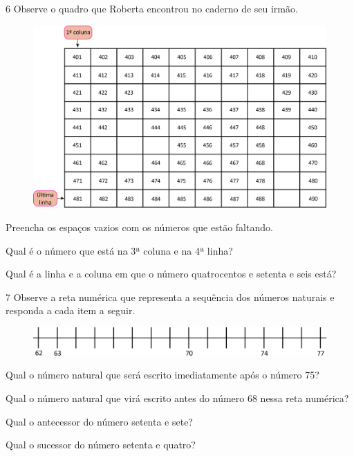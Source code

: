 \pagebreak
\num{6} Observe o quadro que Roberta encontrou no caderno de seu irmão.

\begin{figure}[htpb!]
\includegraphics[width=\textwidth]{./media/image30.png}
\end{figure}

\begin{escolha}
\item Preencha os espaços vazios com os números que estão faltando.

\item Qual é o número que está na 3ª coluna e na 4ª linha?

\item Qual é a linha e a coluna em que o número quatrocentos e setenta e seis está?
\end{escolha}

\vspace{-2ex}

\num{7} Observe a reta numérica que representa a sequência dos números naturais e responda a cada item a seguir.

\begin{figure}[htpb!]
\includegraphics[width=\textwidth]{./media/image31.png}
\end{figure}

\begin{escolha}
\item Qual o número natural que será escrito imediatamente após o número 75?

\item Qual o número natural que virá escrito antes do número 68 nessa reta numérica?

\item Qual o antecessor do número setenta e sete?

\item Qual o sucessor do número setenta e quatro?
\end{escolha}

